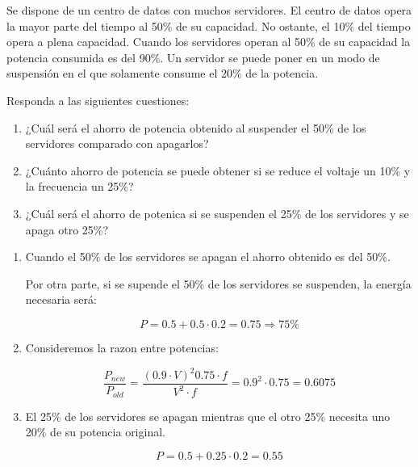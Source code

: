 \begin{acexercise}\end{acexercise}

Se dispone de un centro de datos con muchos servidores. El centro de datos opera
la mayor parte del tiempo al 50\% de su capacidad. No ostante, el 10\% del tiempo
opera a plena capacidad. Cuando los servidores operan al 50\% de su capacidad la
potencia consumida es del 90\%. Un servidor se puede poner en un modo de suspensión
en el que solamente consume el 20\% de la potencia.

Responda a las siguientes cuestiones:

\begin{enumerate}

\item ¿Cuál será el ahorro de potencia obtenido al suspender el 50\% de los
servidores comparado con apagarlos?

\item ¿Cuánto ahorro de potencia se puede obtener si se reduce el voltaje un
10\% y la frecuencia un 25\%?

\item ¿Cuál será el ahorro de potenica si se suspenden el 25\% de los servidores
y se apaga otro 25\%?

\end{enumerate}


\begin{acsolution}\end{acsolution}

\begin{enumerate}

\item Cuando el 50\% de los servidores se apagan el ahorro obtenido es del 50\%.

Por otra parte, si se supende el 50\% de los servidores se suspenden, la energía 
necesaria será:

\[P = 0.5 + 0.5 \cdot 0.2 = 0.75 \Rightarrow 75\%\]

\item Consideremos la razon entre potencias:

\[
\frac{P_{new}}{P_{old}} =
\frac{(0.9 \cdot V)^2 0.75 \cdot f}{V^2 \cdot f} =
0.9^2 \cdot 0.75 =
0.6075
\]

\item El 25\% de los servidores se apagan mientras que el otro 25\%
necesita uno 20\% de su potencia original.

\[
P = 0.5 + 0.25 \cdot 0.2 = 0.55
\]

\end{enumerate}

